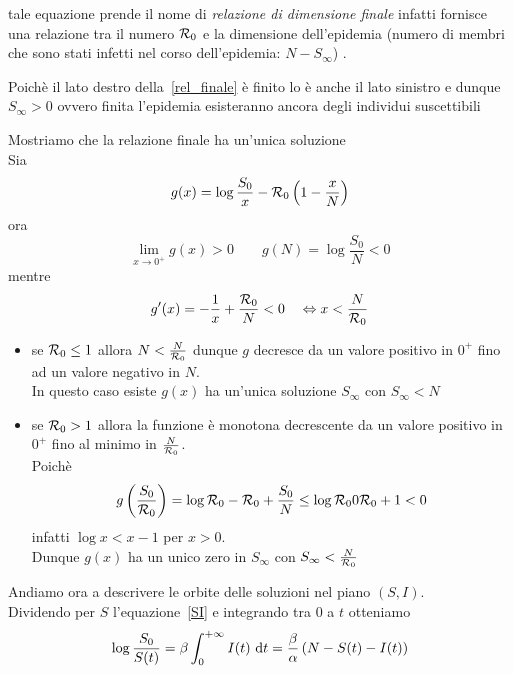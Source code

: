 tale equazione prende il nome di \textit{ relazione di dimensione finale} infatti fornisce una relazione tra il numero $\mathcal R_0$ e la dimensione dell'epidemia (numero di membri che sono stati infetti nel corso dell'epidemia: $ N-S_\infty$) .
\begin{oss}
Poich\`e il lato destro della~\ref{rel_finale} \`e finito lo \`e anche il lato sinistro e dunque $S_\infty >0$ ovvero finita l'epidemia esisteranno ancora degli individui suscettibili	
\end{oss}

\begin{oss}
Mostriamo che la relazione finale ha un'unica soluzione \\
Sia 
$$ g(x) =\log \frac{S_0}{x} -\mathcal R_0 \left(  1 -\frac{x}{N} \right)$$
ora 
$$\lim_{x\to 0^+} g(x)>0 \qquad g(N) =\log\frac{S_0}{N} < 0$$ 
mentre
$$g'(x)=-\frac{1}{x} + \frac{\mathcal R_0}{N} < 0\quad \Leftrightarrow x < \frac{N}{\mathcal R_0} $$
\begin{itemize}
	\item se $\mathcal R_0\leq 1 $ allora $N < \frac{N}{\mathcal R_0}$ dunque $g$ decresce da un valore positivo in $0^+$  fino ad un valore negativo in $N$.\\
	In questo caso esiste $g(x)$ ha un'unica soluzione $S_\infty$ con $S_\infty< N $	
	\item se $\mathcal R_0 >1$ allora la funzione \`e monotona decrescente da un valore positivo in $0^+$ fino al minimo in $\frac{N}{\mathcal R_0}$.\\
Poich\`e 
$$ g\left(  \frac{S_0}{\mathcal R_0} \right) =\log \mathcal R_0 - \mathcal R_0 +\frac{S_0}{N}\leq \log \mathcal R_0 0 \mathcal R_0 + 1 <0$$
infatti $\log x < x - 1$ per $x>0$.\\
Dunque $g(x)$ ha un unico zero in $S_\infty$ con $S_\infty< \frac{N}{\mathcal R_0}$
\end{itemize}	
\end{oss}

\vspace{0.5 cm}

Andiamo ora a descrivere le orbite delle soluzioni nel piano $(S,I)$.\\
Dividendo per $S$  l'equazione~\ref{SI} e integrando tra $0$ a $t$ otteniamo 
$$ \log \frac{S_0}{S(t)} =\beta \int_0^{+\infty } I(t) \,\,\mathrm{d} t = \frac{\beta}{\alpha} \left(  N- S(t) - I(t) \right)$$ 
\vspace{0.5 cm}

